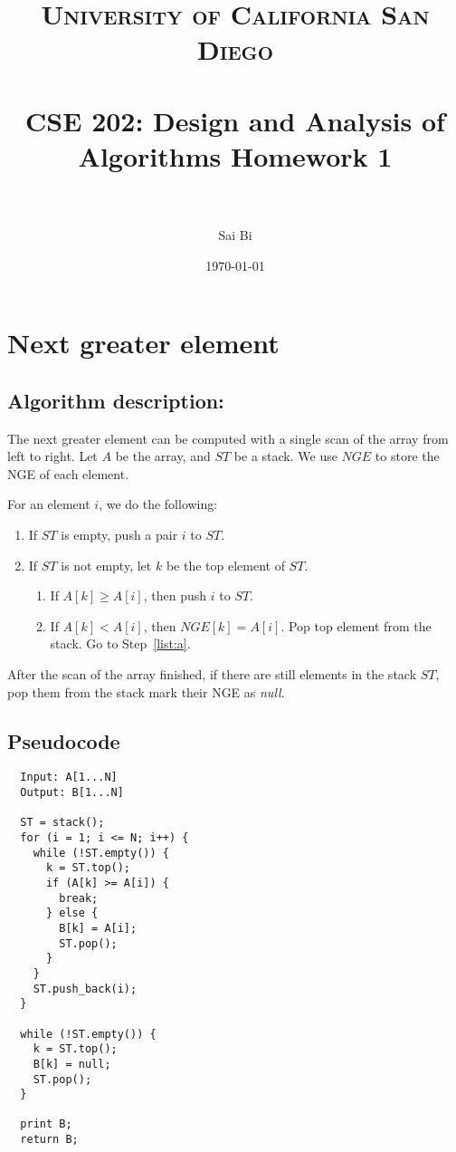\documentclass[paper=a4, fontsize=11pt]{scrartcl} %
\title{	
\normalfont \normalsize 
\textsc{University of California San Diego} \\ [25pt] %
\horrule{0.5pt} \\[0.4cm] %
\huge CSE 202: Design and Analysis of Algorithms Homework 1 \\ %
\horrule{2pt} \\[0.5cm] %
}
\author{Sai Bi} %
\date{\normalsize\today} %
\numberwithin{equation}{section} %
\numberwithin{figure}{section} %
\numberwithin{table}{section} %
\numberwithin{claimcounter}{section}
\begin{document}
\maketitle %

\section{Next greater element}

\subsection*{Algorithm description:}
The next greater element can be computed with a single scan of the array from
left to right. Let $A$ be the array, and $ST$ be a stack. We use $NGE$ to store
the NGE of each element.

For an element $i$, we do the following:
\begin{enumerate}
  \item \label{list:a} If $ST$ is empty, push a pair $i$ to $ST$.
  \item If $ST$ is not empty, let $k$ be the top element of $ST$.
    \begin{enumerate}
      \item If $A[k] \geq A[i]$, then push $i$ to $ST$.
      \item If $A[k] < A[i]$, then $NGE[k] = A[i]$. Pop top element from the
        stack. Go to Step~\ref{list:a}.
    \end{enumerate}
\end{enumerate}
After the scan of the array finished, if there are still elements in the stack
$ST$, pop them from the stack mark their NGE as \textit{null}.

\subsection*{Pseudocode}
\begin{verbatim}
  Input: A[1...N]
  Output: B[1...N]

  ST = stack();
  for (i = 1; i <= N; i++) {
    while (!ST.empty()) {
      k = ST.top();
      if (A[k] >= A[i]) {
        break;
      } else {
        B[k] = A[i];
        ST.pop();
      }
    }
    ST.push_back(i);
  } 

  while (!ST.empty()) {
    k = ST.top();
    B[k] = null; 
    ST.pop();
  }

  print B;
  return B;
\end{verbatim}
\end{document}
